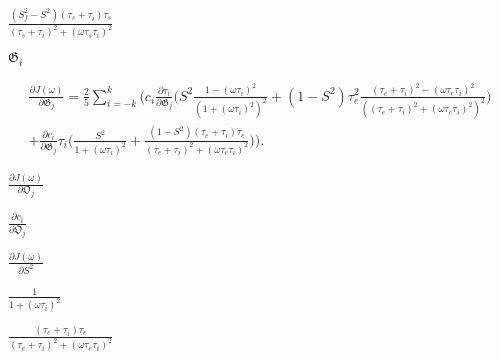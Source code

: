 \documentclass[a4paper,11pt,twoside,openright]{book}
\def\lthtmlcheckvsize{\ifdim\ht\sizebox<\vsize 
  \ifdim\wd\sizebox<\hsize\expandafter\hfill\fi \expandafter\vfill
  \else\expandafter\vss\fi}%
\begin{document}
{\newpage\clearpage
{}%
$\displaystyle {\frac{{(S^2_f - S^2)(\tau_s + \tau_i)\tau_s}}{{(\tau_s + \tau_i)^2 + (\omega \tau_s \tau_i)^2}}}$%
\lthtmlindisplaymathZ
\lthtmlcheckvsize\clearpage}

{\newpage\clearpage
{}%
$ \mathfrak{G}_i$%
\lthtmlindisplaymathZ
\lthtmlcheckvsize\clearpage}

{\newpage\clearpage
{}%
\begin{multline}
    \frac{\partial J(\omega)}{\partial \mathfrak{G}_j} = \frac{2}{5} \sum_{i=-k}^k \Bigg(
        c_i \frac{\partial \tau_i}{\partial \mathfrak{G}_j} \Bigg(
            S^2 \frac{1 - (\omega \tau_i)^2}{\left(1 + (\omega \tau_i)^2 \right)^2}
            + (1 - S^2) \tau_e^2 \frac{(\tau_e + \tau_i)^2 - (\omega \tau_e \tau_i)^2}{\left((\tau_e + \tau_i)^2 + (\omega \tau_e \tau_i)^2 \right)^2}
        \Bigg) \\
        +  \frac{\partial c_i}{\partial \mathfrak{G}_j} \tau_i \Bigg(
            \frac{S^2}{1 + (\omega \tau_i)^2}
            + \frac{(1 - S^2)(\tau_e + \tau_i)\tau_e}{(\tau_e + \tau_i)^2 + (\omega \tau_e \tau_i)^2}
        \Bigg)
    \Bigg).
\end{multline}%
\lthtmldisplayZ
\lthtmlcheckvsize\clearpage}

{\newpage\clearpage
{}%
$\displaystyle {\frac{{\partial J(\omega)}}{{\partial \mathfrak{O}_j}}}$%
\lthtmlindisplaymathZ
\lthtmlcheckvsize\clearpage}

{\newpage\clearpage
{}%
$\displaystyle {\frac{{\partial c_i}}{{\partial \mathfrak{O}_j}}}$%
\lthtmlindisplaymathZ
\lthtmlcheckvsize\clearpage}

{\newpage\clearpage
{}%
$\displaystyle {\frac{{\partial J(\omega)}}{{\partial S^2}}}$%
\lthtmlindisplaymathZ
\lthtmlcheckvsize\clearpage}

{\newpage\clearpage
{}%
$\displaystyle {\frac{{1}}{{1 + (\omega \tau_i)^2}}}$%
\lthtmlindisplaymathZ
\lthtmlcheckvsize\clearpage}

{\newpage\clearpage
{}%
$\displaystyle {\frac{{(\tau_e + \tau_i)\tau_e}}{{(\tau_e + \tau_i)^2 + (\omega \tau_e \tau_i)^2}}}$%
\lthtmlindisplaymathZ
\lthtmlcheckvsize\clearpage}
\end{document}

